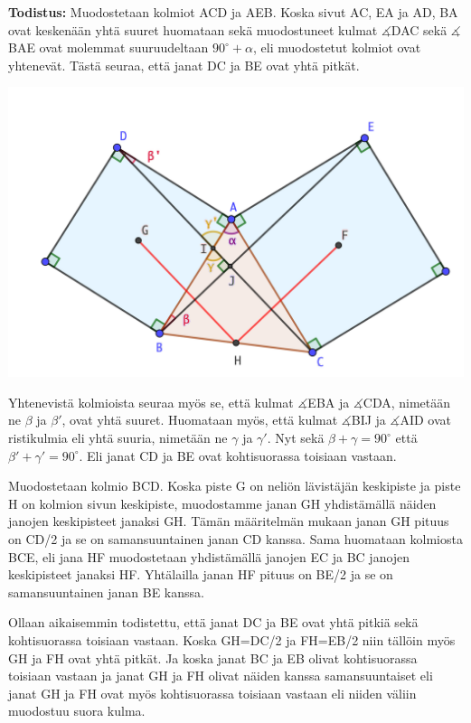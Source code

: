 \documentclass{scrartcl}
\begin{document}
\textbf{Todistus:} Muodostetaan kolmiot ACD ja AEB. Koska sivut AC, EA ja AD, BA ovat keskenään yhtä suuret huomataan sekä muodostuneet kulmat $\measuredangle$DAC sekä $\measuredangle$BAE ovat molemmat suuruudeltaan $90^\circ + \alpha$, eli muodostetut kolmiot ovat yhtenevät. Tästä seuraa, että janat DC ja BE ovat yhtä pitkät.
\begin{center}
    \includegraphics[scale=0.6]{kolmiojatkoa}
\end{center}

Yhtenevistä kolmioista seuraa myös se, että kulmat $\measuredangle$EBA ja $\measuredangle$CDA, nimetään ne $\beta$ ja $\beta'$, ovat yhtä suuret. Huomataan myös, että kulmat $\measuredangle$BIJ ja $\measuredangle$AID ovat ristikulmia eli yhtä suuria, nimetään ne $\gamma$ ja $\gamma'$. Nyt sekä $\beta + \gamma = 90^\circ$ että $\beta' + \gamma' = 90^\circ$. Eli janat CD ja BE ovat kohtisuorassa toisiaan vastaan.

Muodostetaan kolmio BCD. Koska piste G on neliön lävistäjän keskipiste ja piste H on kolmion sivun keskipiste, muodostamme janan GH yhdistämällä näiden janojen keskipisteet janaksi GH. Tämän määritelmän mukaan janan GH pituus on CD/2 ja se on samansuuntainen janan CD kanssa. Sama huomataan kolmiosta BCE, eli jana HF muodostetaan yhdistämällä janojen EC ja BC janojen keskipisteet janaksi HF. Yhtälailla janan HF pituus on BE/2 ja se on samansuuntainen janan BE kanssa.

Ollaan aikaisemmin todistettu, että janat DC ja BE ovat yhtä pitkiä sekä kohtisuorassa toisiaan vastaan. Koska GH=DC/2 ja FH=EB/2 niin tällöin myös GH ja FH ovat yhtä pitkät. Ja koska janat BC ja EB olivat kohtisuorassa toisiaan vastaan ja janat GH ja FH olivat näiden kanssa samansuuntaiset eli janat GH ja FH ovat myös kohtisuorassa toisiaan vastaan eli niiden väliin muodostuu suora kulma.
\end{document}
